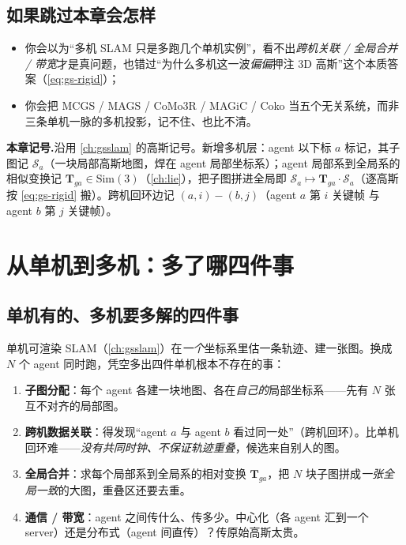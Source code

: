 \subsection*{如果跳过本章会怎样}
\begin{itemize}
  \item 你会以为“多机 SLAM 只是多跑几个单机实例”，看不出\emph{跨机关联 / 全局合并 / 带宽}才是真问题，也错过“为什么多机这一波\emph{偏偏}押注 3D 高斯”这个本质答案（\cref{eq:gs-rigid}）；
  \item 你会把 MCGS / MAGS / CoMo3R / MAGiC / Coko 当五个无关系统，而非三条单机一脉的多机投影，记不住、也比不清。
\end{itemize}

\begin{note}
\textbf{本章记号.}\;沿用 \cref{ch:gsslam} 的高斯记号。新增多机层：agent 以下标 $a$ 标记，其子图记 $\mathcal S_a$（一块局部高斯地图，焊在 agent 局部坐标系）；agent 局部系到全局系的相似变换记 $\mathbf T_{ga}\in\mathrm{Sim}(3)$（\cref{ch:lie}），把子图拼进全局即 $\mathcal S_a\mapsto\mathbf T_{ga}\cdot\mathcal S_a$（逐高斯按 \cref{eq:gs-rigid} 搬）。跨机回环边记 $(a,i)\!-\!(b,j)$（agent $a$ 第 $i$ 关键帧 与 agent $b$ 第 $j$ 关键帧）。
\end{note}

\section{从单机到多机：多了哪四件事}
\label{sec:mags-intro}

\subsection{单机有的、多机要多解的四件事}

单机可渲染 SLAM（\cref{ch:gsslam}）在\emph{一个}坐标系里估一条轨迹、建一张图。换成 $N$ 个 agent 同时跑，凭空多出四件单机根本不存在的事：
\begin{enumerate}
  \item \textbf{子图分配}：每个 agent 各建一块地图、各在\emph{自己的}局部坐标系——先有 $N$ 张互不对齐的局部图。
  \item \textbf{跨机数据关联}：得发现“agent $a$ 与 agent $b$ 看过同一处”（跨机回环）。比单机回环难——\emph{没有共同时钟、不保证轨迹重叠}，候选来自别人的图。
  \item \textbf{全局合并}：求每个局部系到全局系的相对变换 $\mathbf T_{ga}$，把 $N$ 块子图拼成\emph{一张全局一致}的大图，重叠区还要去重。
  \item \textbf{通信 / 带宽}：agent 之间传什么、传多少。中心化（各 agent 汇到一个 server）还是分布式（agent 间直传）？传原始高斯太贵。
\end{enumerate}

